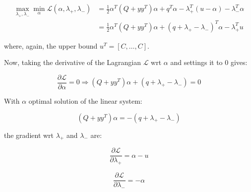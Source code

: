 \begin{equation} \label{eq:svc_bcqp_lagrangian_dual}
	\begin{aligned}
    	\max_{\lambda_+,\lambda_-} \min_{\alpha} \mathcal{L}(\alpha,\lambda_+,\lambda_-) &= \frac{1}{2} \alpha^T (Q + yy^T)\alpha+q^T\alpha - \lambda_+^T (u - \alpha) - \lambda_-^T \alpha \\
    &= \frac{1}{2} \alpha^T (Q + yy^T)\alpha + (q + \lambda_+ - \lambda_-)^T \alpha - \lambda_+^T u
	\end{aligned}
\end{equation}

where, again, the upper bound $u^T = [C, \dots, C]$.

Now, taking the derivative of the Lagrangian $\mathcal{L}$ wrt $\alpha$ and settings it to 0 gives:

\begin{equation} \label{eq:svc_bcqp_lagrangian_der_a}
	\frac{\partial \mathcal{L}}{\partial \alpha}=0\Rightarrow (Q + yy^T) \alpha + (q + \lambda_+ - \lambda_-) = 0
\end{equation}

With $\alpha$ optimal solution of the linear system:

\begin{equation} \label{eq:svc_bcqp_lagrangian_sol}
    (Q + yy^T) \alpha = - (q + \lambda_+ - \lambda_-)
\end{equation}

the gradient wrt $\lambda_+$ and $\lambda_-$ are:

\begin{equation} \label{eq:svc_bcqp_lagrangian_der_lp}
	\frac{\partial \mathcal{L}}{\partial \lambda_+}=\alpha - u
\end{equation}

\begin{equation} \label{eq:svc_bcqp_lagrangian_der_lm}
    \frac{\partial \mathcal{L}}{\partial \lambda_-}=-\alpha
\end{equation}
